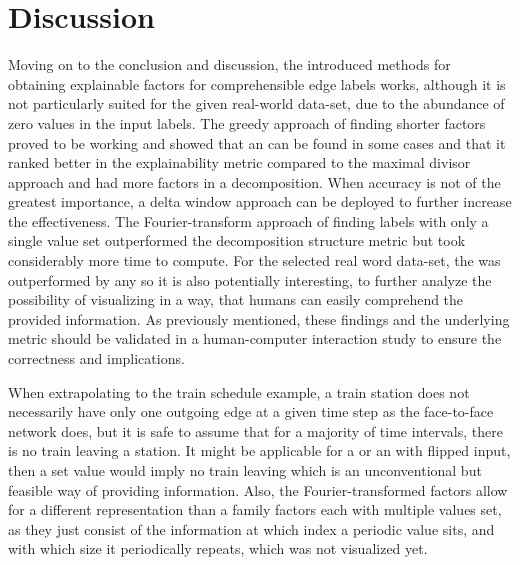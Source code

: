 
\chapter{Discussion}
\label{ch:Discussion}
Moving on to the conclusion and discussion, the introduced methods for obtaining explainable factors for comprehensible edge labels works, although it is not particularly suited for the given real-world data-set, due to the abundance of zero values in the input labels.
The greedy approach of finding shorter factors proved to be working and showed that an \orDecomp can be found in some cases and that it ranked better in the explainability metric compared to the maximal divisor approach and had more factors in a decomposition.
When accuracy is not of the greatest importance, a delta window approach can be deployed to further increase the effectiveness.
The Fourier-transform approach of finding labels with only a single value set outperformed the decomposition structure metric but took considerably more time to compute.
For the selected real word data-set, the \orDecomp was outperformed by any \andDecomp so it is also potentially interesting, to further analyze the possibility of visualizing \andDecomp in a way, that humans can easily comprehend the provided information.
As previously mentioned, these findings and the underlying metric should be validated in a human-computer interaction study to ensure the correctness and implications. 

When extrapolating to the train schedule example, a train station does not necessarily have only one outgoing edge at a given time step as the face-to-face network does, but it is safe to assume that for a majority of time intervals, there is no train leaving a station.
It might be applicable for a \andDecomp or an \orDecomp with flipped input, then a set value would imply no train leaving which is an unconventional but feasible way of providing information.
Also, the Fourier-transformed factors allow for a different representation than a family factors each with multiple values set, as they just consist of the information at which index a periodic value sits, and with which size it periodically repeats, which was not visualized yet.


